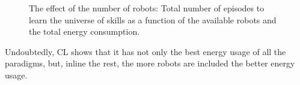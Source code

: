 \begin{figure}[!t]
	\centering
	\hspace*{\fill}
	\hfill	
	\hspace*{\fill}
	\hspace*{\fill}
	\caption[] {\label{fig:final_results} The effect of the number of robots:  Total number of episodes to learn the universe of skills as a function of the available robots and  the total energy consumption.}
\end{figure}

Undoubtedly, CL shows that it has not only the best energy usage of all the paradigms, but, inline the rest, the more robots are included the better energy usage. 

